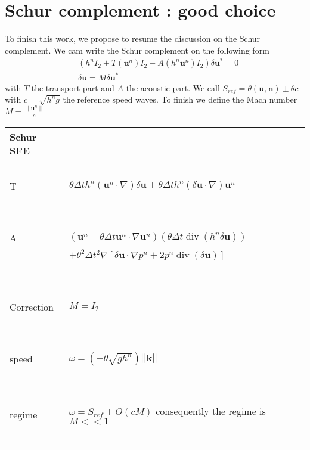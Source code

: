 \documentclass[a4paper, 11pt]{article}
\begin{document}
\section{Schur complement : good choice}
To finish this work, we propose to resume the discussion on the Schur complement.
We cam write the Schur complement on the following form
\begin{align*}
&\left(h^n I_2 + T(\boldsymbol{u}^n) I_2 - A(h^n\boldsymbol{u}^n)I_2\right)\delta \boldsymbol{u}^* =0\\
&\delta \boldsymbol{u} = M \delta \boldsymbol{u}^*
\end{align*}
with $T$ the transport part and $A$ the acoustic part. We call $S_{ref}=\theta(\boldsymbol{u},\boldsymbol{n})\pm \theta c$ with $c=\sqrt{h^n g}$ the reference speed waves. To finish we define the Mach number $M= \frac{\parallel \boldsymbol{u}^n \parallel }{c}$
\begin{table}
\begin{tabular}{|l|l|}
  \hline
  Schur SFE &  \\
  \hline
  ~ & ~\\
  T &  $\theta\Delta th^n\left(\boldsymbol{u}^n\cdot\nabla\right)\delta \boldsymbol{u}+\theta\Delta th^n\left(\delta \boldsymbol{u} \cdot\nabla\right)\boldsymbol{u}^n$ \\ 
  ~ & ~\\
    \hline
   ~& ~\\ 
  A= &$\left(\boldsymbol{u}^n+\theta \Delta t \boldsymbol{u}^n\cdot \nabla \boldsymbol{u}^n \right)\left(\theta \Delta t \operatorname{div}(h^n \delta \boldsymbol{u})\right) $\\
  ~&$+\theta^2 \Delta t^2 \nabla\left[ \delta \boldsymbol{u}\cdot \nabla p^n + 2p^n \operatorname{div}(\delta \boldsymbol{u}) \right] $\\
  ~ & ~\\
    \hline
     ~ &~ \\
   Correction &  $M=I_2$ \\ 
   ~ & ~\\
    \hline
     ~ &~ \\
  speed & $\omega=\left(\pm\theta\sqrt{gh^n}\right)||\boldsymbol{k}||$ \\ 
   ~ & ~\\
    \hline
    ~& ~\\
  regime & $\omega=S_{ref}+O(cM)$ consequently the regime is $M<< 1$\\
   ~& ~\\
    \hline
\end{tabular}
\end{table}
\end{document}
